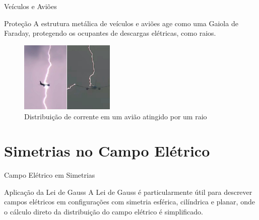 \documentclass{beamer}
\begin{document}
  \begin{frame}{Veículos e Aviões}
  \begin{block}{Proteção}
  A estrutura metálica de veículos e aviões age como uma Gaiola de Faraday, protegendo os ocupantes de descargas elétricas, como raios.
  \end{block}
  
  \begin{figure}
  \centering
  \includegraphics[width=0.4\textwidth]{images/aviao_raio.png}
  \caption{Distribuição de corrente em um avião atingido por um raio}
  \end{figure}
  
  \end{frame}
  
  \section{Simetrias no Campo Elétrico}
  
  \begin{frame}{Campo Elétrico em Simetrias}
  \begin{block}{Aplicação da Lei de Gauss}
  A Lei de Gauss é particularmente útil para descrever campos elétricos em configurações com simetria esférica, cilíndrica e planar, onde o cálculo direto da distribuição do campo elétrico é simplificado.
  \end{block}
  
  
  \end{frame}
\end{document}
